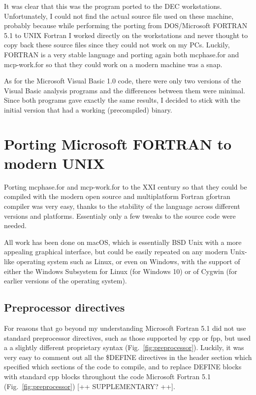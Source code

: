 It was clear that this was the program ported to the DEC workstations. 
Unfortunately, I could not find the actual source file used on these machine, probably because while performing the porting from DOS/Microsoft FORTRAN 5.1 to UNIX Fortran I worked directly on the workstations and never thought to copy back these source files since they could not work on my PCs.
Luckily, FORTRAN is a very stable language and porting again both \textsf{mcphase.for} and \textsf{mcp-work.for} so that they could work on a modern machine was a snap.

As for the Microsoft Visual Basic 1.0 code, there were only two versions of the Visual Basic analysis programs and the differences between them were minimal. Since both programs gave exactly the same results, I decided to stick with the initial version that had a working (precompiled) binary.



\section{Porting Microsoft FORTRAN to modern UNIX}

Porting \textsf{mcphase.for} and \textsf{mcp-work.for} to the XXI century so that they could be compiled with the modern open source and multiplatform Fortran \textsf{gfortran} compiler was very easy, thanks to the stability of the language across different versions and platforms. Essentialy only a few tweaks to the source code were needed.

All work has been done on macOS, which is essentially BSD Unix with a more appealing graphical interface, but could be easily repeated on any modern Unix-like operating system such as Linux, or even on Windows, with the support of either the Windows Subsystem for Linux (for Windows 10) or of Cygwin (for earlier versions of the operating system).



\subsection{Preprocessor directives}

For reasons that go beyond my understanding Microsoft Fortran 5.1 did not use standard preprocessor directives, such as those supported by \textsf{cpp} or \textsf{fpp}, \cite{Boyanski:1992} but used a a slightly different proprietary syntax (Fig.~\ref{fig:preprocessor}). 
Luckily, it was very easy to comment out all the \textsf{\$DEFINE} directives in the header section which specified which sections of the code to compile, and to replace \textsf{DEFINE} blocks with standard \textsf{cpp} blocks throughout the code Microsoft Fortran 5.1 (Fig.~\ref{fig:preprocessor}) [++ SUPPLEMENTARY? ++]. 


